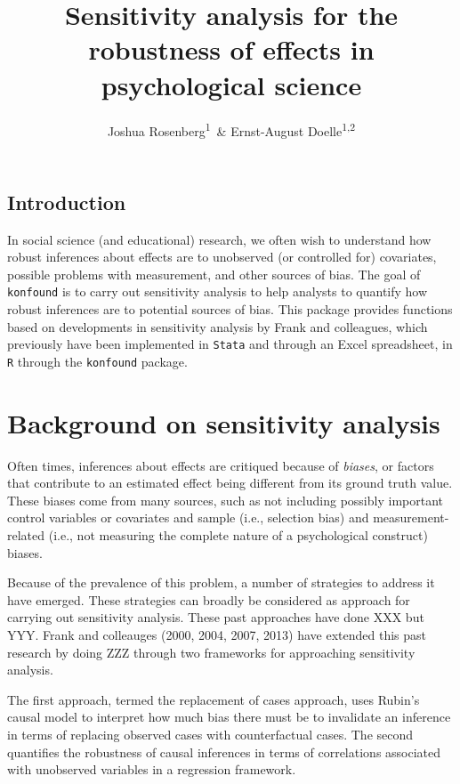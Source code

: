 \documentclass[man]{apa6}
\title{Sensitivity analysis for the robustness of effects in psychological
science}
\author{Joshua Rosenberg\textsuperscript{1}~\& Ernst-August
Doelle\textsuperscript{1,2}}
\date{}
\affiliation{
\vspace{0.5cm}
\textsuperscript{1} Wilhelm-Wundt-University\\\textsuperscript{2} Konstanz Business School}
\begin{document}
\maketitle

\subsection{Introduction}\label{introduction}

In social science (and educational) research, we often wish to
understand how robust inferences about effects are to unobserved (or
controlled for) covariates, possible problems with measurement, and
other sources of bias. The goal of \texttt{konfound} is to carry out
sensitivity analysis to help analysts to quantify how robust inferences
are to potential sources of bias. This package provides functions based
on developments in sensitivity analysis by Frank and colleagues, which
previously have been implemented in \texttt{Stata} and through an Excel
spreadsheet, in \texttt{R} through the \texttt{konfound} package.

\section{Background on sensitivity
analysis}\label{background-on-sensitivity-analysis}

Often times, inferences about effects are critiqued because of
\emph{biases}, or factors that contribute to an estimated effect being
different from its ground truth value. These biases come from many
sources, such as not including possibly important control variables or
covariates and sample (i.e., selection bias) and measurement-related
(i.e., not measuring the complete nature of a psychological construct)
biases.

Because of the prevalence of this problem, a number of strategies to
address it have emerged. These strategies can broadly be considered as
approach for carrying out sensitivity analysis. These past approaches
have done XXX but YYY. Frank and colleauges (2000, 2004, 2007, 2013)
have extended this past research by doing ZZZ through two frameworks for
approaching sensitivity analysis.

The first approach, termed the replacement of cases approach, uses
Rubin's causal model to interpret how much bias there must be to
invalidate an inference in terms of replacing observed cases with
counterfactual cases. The second quantifies the robustness of causal
inferences in terms of correlations associated with unobserved variables
in a regression framework.
\end{document}
